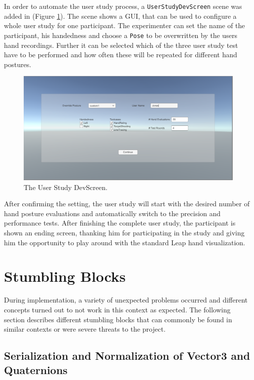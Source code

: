 In order to automate the user study process, a \texttt{UserStudyDevScreen} scene was added in (Figure \ref{fig:devscreen}). The scene shows a GUI, that can be used to configure a whole user study for one participant. The experimenter can set the name of the participant, his handedness and choose a \texttt{Pose} to be overwritten by the users hand recordings. Further it can be selected which of the three user study test have to be performed and how often these will be repeated for different hand postures. 

\begin{figure}
\centering
\includegraphics[width=\textwidth]{devscreen}
\caption{The User Study DevScreen.}
\label{fig:devscreen}
\end{figure}

After confirming the setting, the user study will start with the desired number of hand posture evaluations and automatically switch to the precision and performance tests. After finishing the complete user study, the participant is shown an ending screen, thanking him for participating in the study and giving him the opportunity to play around with the standard Leap hand visualization. 

\section{Stumbling Blocks}

During implementation, a variety of unexpected problems occurred and different concepts turned out to not work in this context as expected. The following section describes different stumbling blocks that can commonly be found in similar contexts or were severe threats to the project. 

\subsection{Serialization and Normalization of Vector3 and Quaternions}

